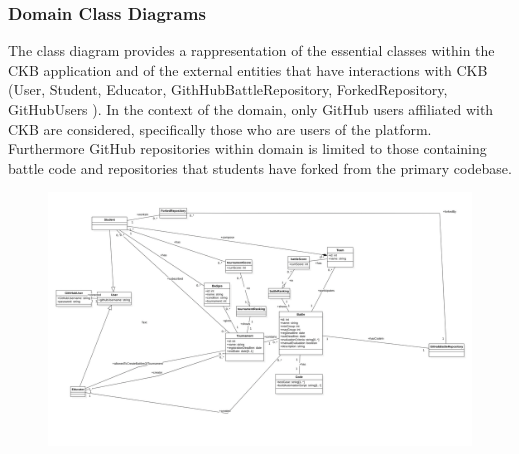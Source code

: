 
\subsubsection{Domain Class Diagrams}

The class diagram  provides a rappresentation of the essential classes within the CKB application and of the external entities that have interactions with CKB (User, Student, Educator, GithHubBattleRepository, ForkedRepository, GitHubUsers ).
In the context of the domain, only GitHub users affiliated with CKB are considered, specifically those who are users of the platform. Furthermore GitHub repositories within domain is limited to those containing battle code and repositories that students have forked from the primary codebase.


\begin{figure}[]    
    \includegraphics[width=1\textwidth]{RASD/2Overall_Description/res/FINALCD.png}
\end{figure}
\clearpage
